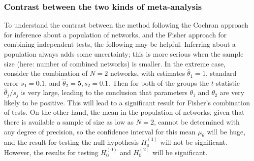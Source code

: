 \documentclass[a4paper,fleqn,11pt]{article}
\newcommand{\+}{\, + \,}
\begin{document}

\subsubsection{Contrast between the two kinds of meta-analysis }

To understand the contrast between the method following the Cochran approach
for inference about a population of networks,
and the Fisher approach for combining independent tests, the following
may be helpful.
Inferring about a population always adds some uncertainty;
this is more serious when the sample size (here: number of combined networks)
is smaller.
In the extreme case, consider the combination of $N=2$ networks,
with estimates $\hat\theta_1 = 1$, standard error $s_1 = 0.1$,
and $\hat\theta_2 = 5, s_2 = 0.1$.
Then for both of the groups the $t$-statistic $\hat\theta_j/s_j$ is very large,
leading to the conclusion that parameters $\theta_1$ and $\theta_2$
are very likely to be positive.
This will lead to a significant result for Fisher's combination of tests.
On the other hand, the mean in the population of networks, given that
there is available a sample of size as low as $N=2$, cannot be determined with
any degree of precision, so the confidence interval for this mean $\mu_\theta$
will be huge, and the result for testing the null hypothesis
$H_0^{(1)}$ will not be significant.
However, the results for testing $H_0^{(0)}$ and $H_0^{(2)}$
will be significant.
\end{document}
